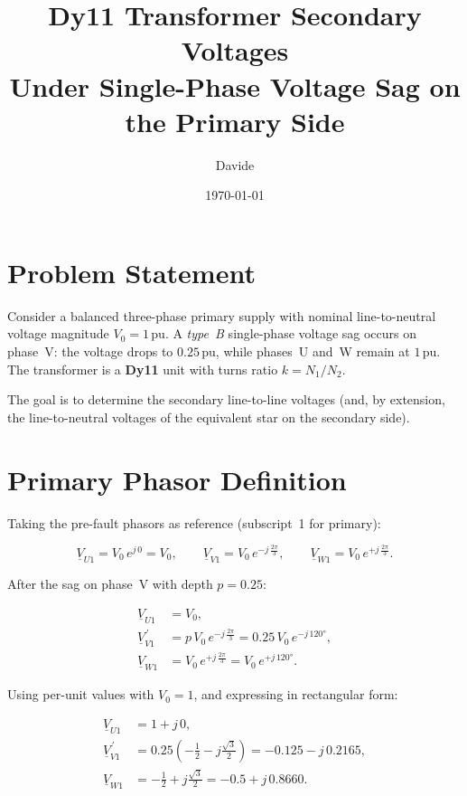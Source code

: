 \documentclass[a4paper,11pt]{article}
\title{\textbf{Dy11 Transformer Secondary Voltages\\
Under Single-Phase Voltage Sag on the Primary Side}}
\author{Davide}
\date{\today}
\begin{document}
\maketitle
\tableofcontents
\bigskip

\section{Problem Statement}
\label{sec:problem}

Consider a balanced three-phase primary supply with nominal line-to-neutral
voltage magnitude $V_0 = 1\,\mathrm{pu}$.  A \emph{type~B} single-phase
voltage sag occurs on phase~V: the voltage drops to $0.25\,\mathrm{pu}$,
while phases~U and~W remain at $1\,\mathrm{pu}$.  The transformer is a
\textbf{Dy11} unit with turns ratio $k = N_1/N_2$.

The goal is to determine the secondary line-to-line voltages (and, by
extension, the line-to-neutral voltages of the equivalent star on the
secondary side).

\section{Primary Phasor Definition}
\label{sec:primary}

Taking the pre-fault phasors as reference (subscript~1 for primary):

\begin{equation}
\underline{V}_{U1} = V_0\,e^{j\,0}
               = V_0,
\qquad
\underline{V}_{V1} = V_0\,e^{-j\,\frac{2\pi}{3}},
\qquad
\underline{V}_{W1} = V_0\,e^{+j\,\frac{2\pi}{3}}.
\end{equation}

After the sag on phase~V with depth $p = 0.25$:

\begin{align}
\underline{V}_{U1} &= V_0, \label{eq:Vu1}\\
\underline{V}_{V1}^{\,\prime} &= p\,V_0\,e^{-j\,\frac{2\pi}{3}}
   = 0.25\,V_0\,e^{-j\,120°}, \label{eq:Vv1}\\
\underline{V}_{W1} &= V_0\,e^{+j\,\frac{2\pi}{3}}
   = V_0\,e^{+j\,120°}. \label{eq:Vw1}
\end{align}

\noindent Using per-unit values with $V_0 = 1$, and expressing in
rectangular form:

\begin{align}
\underline{V}_{U1} &= 1 + j\,0, \\
\underline{V}_{V1}^{\,\prime} &= 0.25\!\left(-\tfrac{1}{2} - j\tfrac{\sqrt{3}}{2}\right)
   = -0.125 - j\,0.2165, \\
\underline{V}_{W1} &= -\tfrac{1}{2} + j\tfrac{\sqrt{3}}{2}
   = -0.5 + j\,0.8660.
\end{align}
\end{document}
